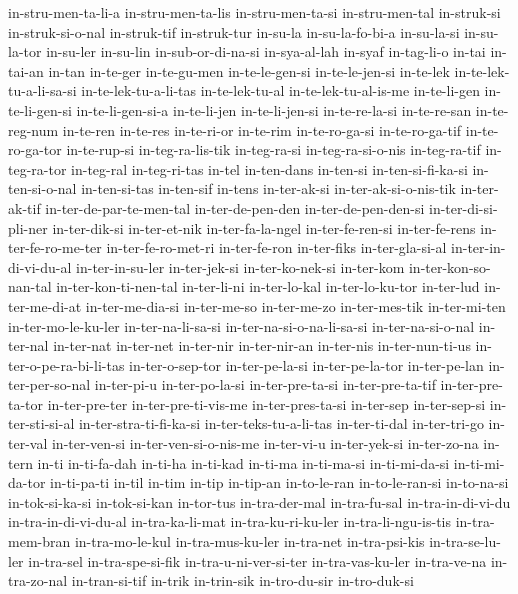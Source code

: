 {in-stru-men-ta-li-a in-stru-men-ta-lis in-stru-men-ta-si in-stru-men-tal
in-struk-si in-struk-si-o-nal in-struk-tif in-struk-tur in-su-la
in-su-la-fo-bi-a in-su-la-si in-su-la-tor in-su-ler in-su-lin
in-sub-or-di-na-si in-sya-al-lah in-syaf in-tag-li-o in-tai in-tai-an
in-tan in-te-ger in-te-gu-men in-te-le-gen-si in-te-le-jen-si in-te-lek
in-te-lek-tu-a-li-sa-si in-te-lek-tu-a-li-tas in-te-lek-tu-al
in-te-lek-tu-al-is-me in-te-li-gen in-te-li-gen-si in-te-li-gen-si-a
in-te-li-jen in-te-li-jen-si in-te-re-la-si in-te-re-san in-te-reg-num
in-te-ren in-te-res in-te-ri-or in-te-rim in-te-ro-ga-si in-te-ro-ga-tif
in-te-ro-ga-tor in-te-rup-si in-teg-ra-lis-tik in-teg-ra-si
in-teg-ra-si-o-nis in-teg-ra-tif in-teg-ra-tor in-teg-ral in-teg-ri-tas
in-tel in-ten-dans in-ten-si in-ten-si-fi-ka-si in-ten-si-o-nal
in-ten-si-tas in-ten-sif in-tens in-ter-ak-si in-ter-ak-si-o-nis-tik
in-ter-ak-tif in-ter-de-par-te-men-tal in-ter-de-pen-den
in-ter-de-pen-den-si in-ter-di-si-pli-ner in-ter-dik-si in-ter-et-nik
in-ter-fa-la-ngel in-ter-fe-ren-si in-ter-fe-rens in-ter-fe-ro-me-ter
in-ter-fe-ro-met-ri in-ter-fe-ron in-ter-fiks in-ter-gla-si-al
in-ter-in-di-vi-du-al in-ter-in-su-ler in-ter-jek-si in-ter-ko-nek-si
in-ter-kom in-ter-kon-so-nan-tal in-ter-kon-ti-nen-tal in-ter-li-ni
in-ter-lo-kal in-ter-lo-ku-tor in-ter-lud in-ter-me-di-at in-ter-me-dia-si
in-ter-me-so in-ter-me-zo in-ter-mes-tik in-ter-mi-ten in-ter-mo-le-ku-ler
in-ter-na-li-sa-si in-ter-na-si-o-na-li-sa-si in-ter-na-si-o-nal
in-ter-nal in-ter-nat in-ter-net in-ter-nir in-ter-nir-an in-ter-nis
in-ter-nun-ti-us in-ter-o-pe-ra-bi-li-tas in-ter-o-sep-tor in-ter-pe-la-si
in-ter-pe-la-tor in-ter-pe-lan in-ter-per-so-nal in-ter-pi-u
in-ter-po-la-si in-ter-pre-ta-si in-ter-pre-ta-tif in-ter-pre-ta-tor
in-ter-pre-ter in-ter-pre-ti-vis-me in-ter-pres-ta-si in-ter-sep
in-ter-sep-si in-ter-sti-si-al in-ter-stra-ti-fi-ka-si
in-ter-teks-tu-a-li-tas in-ter-ti-dal in-ter-tri-go in-ter-val
in-ter-ven-si in-ter-ven-si-o-nis-me in-ter-vi-u in-ter-yek-si
in-ter-zo-na in-tern in-ti in-ti-fa-dah in-ti-ha in-ti-kad in-ti-ma
in-ti-ma-si in-ti-mi-da-si in-ti-mi-da-tor in-ti-pa-ti in-til in-tim
in-tip in-tip-an in-to-le-ran in-to-le-ran-si in-to-na-si in-tok-si-ka-si
in-tok-si-kan in-tor-tus in-tra-der-mal in-tra-fu-sal in-tra-in-di-vi-du
in-tra-in-di-vi-du-al in-tra-ka-li-mat in-tra-ku-ri-ku-ler
in-tra-li-ngu-is-tis in-tra-mem-bran in-tra-mo-le-kul in-tra-mus-ku-ler
in-tra-net in-tra-psi-kis in-tra-se-lu-ler in-tra-sel in-tra-spe-si-fik
in-tra-u-ni-ver-si-ter in-tra-vas-ku-ler in-tra-ve-na in-tra-zo-nal
in-tran-si-tif in-trik in-trin-sik in-tro-du-sir in-tro-duk-si
}
